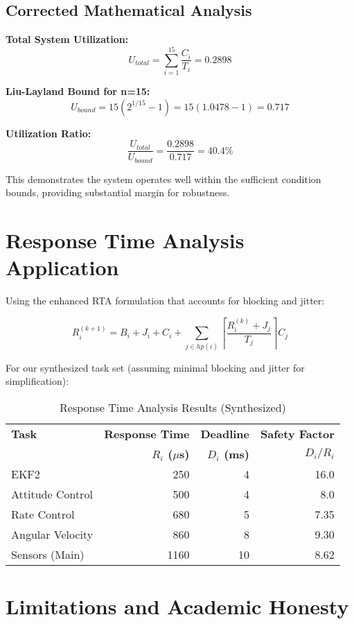 \documentclass[12pt,a4paper]{article}
\begin{document}
\subsection{Corrected Mathematical Analysis}

\textbf{Total System Utilization:}
$$U_{total} = \sum_{i=1}^{15} \frac{C_i}{T_i} = 0.2898$$

\textbf{Liu-Layland Bound for n=15:}
$$U_{bound} = 15(2^{1/15} - 1) = 15(1.0478 - 1) = 0.717$$

\textbf{Utilization Ratio:}
$$\frac{U_{total}}{U_{bound}} = \frac{0.2898}{0.717} = 40.4\%$$

This demonstrates the system operates well within the sufficient condition bounds, providing substantial margin for robustness.

\section{Response Time Analysis Application}

Using the enhanced RTA formulation that accounts for blocking and jitter:

$$R_i^{(k+1)} = B_i + J_i + C_i + \sum_{j \in hp(i)} \left\lceil \frac{R_i^{(k)} + J_j}{T_j} \right\rceil C_j$$

For our synthesized task set (assuming minimal blocking and jitter for simplification):

\begin{table}[H]
\centering
\caption{Response Time Analysis Results (Synthesized)}
\begin{tabular}{lrrr}
\toprule
\textbf{Task} & \textbf{Response Time} & \textbf{Deadline} & \textbf{Safety Factor} \\
& \textbf{$R_i$ ($\mu$s)} & \textbf{$D_i$ (ms)} & \textbf{$D_i/R_i$} \\
\midrule
EKF2 & 250 & 4 & 16.0 \\
Attitude Control & 500 & 4 & 8.0 \\
Rate Control & 680 & 5 & 7.35 \\
Angular Velocity & 860 & 8 & 9.30 \\
Sensors (Main) & 1160 & 10 & 8.62 \\
\bottomrule
\end{tabular}
\end{table}

\section{Limitations and Academic Honesty}
\end{document}
